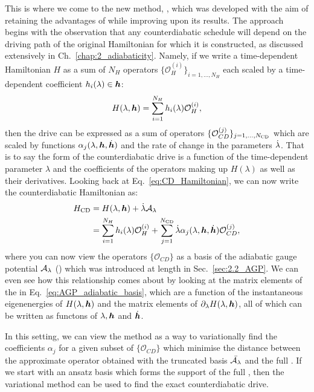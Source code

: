 This is where we come to the new method, , which was developed with the aim of retaining the advantages of  while improving upon its results. The approach begins with the observation that any counterdiabatic schedule will depend on the driving path of the original Hamiltonian for which it is constructed, as discussed extensively in Ch.~\ref{chap:2_adiabaticity}. Namely, if we write a time-dependent Hamiltonian $H$ as a sum of $N_H$ operators $\{ \mathcal{O}_H^{(i)} \}_{i = 1,...,N_H}$ each scaled by a time-dependent coefficient $h_i(\lambda) \in \boldsymbol{h}$:
\begin{equation}
    H(\lambda, \boldsymbol{h}) = \sum_{i = 1}^{N_H} h_i(\lambda) \mathcal{O}_H^{(i)},
\end{equation}
then the  drive can be expressed as a sum of operators $\{\mathcal{O}_{CD}^{(j)}\}_{j = 1,...,N_{\rm CD}}$ which are scaled by functions $\alpha_{j}(\lambda, \boldsymbol{h}, \dot{\boldsymbol{h}})$ and the rate of change in the parameters $\dot{\lambda}$. That is to say the form of the counterdiabatic drive is a function of the time-dependent parameter $\lambda$ and the coefficients of the operators making up $H(\lambda)$ as well as their derivatives. Looking back at Eq.~\eqref{eq:CD_Hamiltonian}, we can now write the counterdiabatic Hamiltonian as:
\begin{equation}
    \begin{aligned}
        H_{\rm CD} &= H(\lambda, \boldsymbol{h}) + \dot{\lambda} \mathcal{A}_{\lambda} \\
        &= \sum_{i = 1}^{N_H} h_i(\lambda) \mathcal{O}_H^{(i)} + \sum_{j = 1}^{N_{\rm CD}} \dot{\lambda} \alpha_{j}(\lambda, \boldsymbol{h}, \dot{\boldsymbol{h}}) \mathcal{O}_{CD}^{(j)},
    \end{aligned}
\end{equation}
where you can now view the operators $\{\mathcal{O}_{CD}\}$ as a basis of the adiabatic gauge potential $\mathcal{A}_{\lambda}$ () which was introduced at length in Sec.~\ref{sec:2.2_AGP}. We can even see how this relationship comes about by looking at the matrix elements of the  in Eq.~\eqref{eq:AGP_adiabatic_basis}, which are a function of the instantaneous eigenenergies of $H(\lambda, \boldsymbol{h})$ and the matrix elements of $\partial_{\lambda} H(\lambda, \boldsymbol{h})$, all of which can be written as functons of $\lambda, \boldsymbol{h}$ and $\dot{\boldsymbol{h}}$. 

In this setting, we can view the  method as a way to variationally find the coefficients $\alpha_j$ for a given subset of $\{\mathcal{O}_{CD}\}$ which minimise the distance between the approximate operator obtained with the truncated basis $\Bar{\mathcal{A}_{\lambda}}$ and the full . If we start with an ansatz basis which forms the support of the full , then the variational method can be used to find the exact counterdiabatic drive. 

